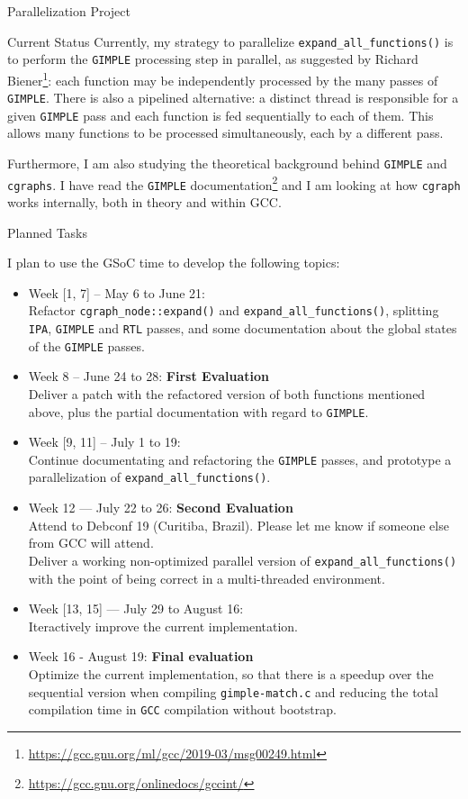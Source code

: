 \documentclass[12pt]{article}
\begin{document}
\begin{section}{Parallelization Project}
\begin{subsection}{Current Status}
Currently, my strategy to parallelize \texttt{expand\_all\_functions()} is to
perform the \texttt{GIMPLE} processing step in parallel, as suggested
by Richard Biener\footnote{\url{https://gcc.gnu.org/ml/gcc/2019-03/msg00249.html}}: each
function may be independently processed by the many passes of
\texttt{GIMPLE}.  There is also a pipelined alternative: a distinct
thread is responsible for a given \texttt{GIMPLE} pass and each
function is fed sequentially to each of them. This allows many
functions to be processed simultaneously, each by a different pass.

Furthermore, I am also studying the theoretical background behind \texttt{GIMPLE}
and \texttt{cgraphs}. I have read the \texttt{GIMPLE}
documentation\footnote{\url{https://gcc.gnu.org/onlinedocs/gccint/}} and
I am looking at how \texttt{cgraph} works internally, both in theory and within
GCC.

\end{subsection}

\begin{subsection}{Planned Tasks}

I plan to use the GSoC time to develop the following topics:

\begin{itemize}
 \item{Week [1, 7] -- May 6 to June 21:} \\
Refactor \texttt{cgraph\_node::expand()} and
\texttt{expand\_all\_functions()}, splitting \texttt{IPA},
\texttt{GIMPLE} and \texttt{RTL} passes, and some documentation about
the global states of the \texttt{GIMPLE} passes.
 \item{Week 8 -- June 24 to 28:} \textbf{First Evaluation} \\
Deliver a patch with the refactored version of both functions mentioned above,
plus the partial documentation with regard to \texttt{GIMPLE}.
 \item{Week [9, 11] -- July 1 to 19:} \\
Continue documentating and refactoring the \texttt{GIMPLE} passes, and
prototype a parallelization of \texttt{expand\_all\_functions()}.
 \item{Week 12 --- July 22 to 26:} \textbf{Second Evaluation} \\
Attend to Debconf 19 (Curitiba, Brazil). Please let me know
if someone else from GCC will attend. \\
Deliver a
working non-optimized parallel version of \texttt{expand\_all\_functions()}
with the point of being correct in a multi-threaded environment.
\item{Week [13, 15] --- July 29 to August 16:} \\
Iteractively improve the current implementation.
\item{Week 16 - August 19:} \textbf{Final evaluation}\\
Optimize the current implementation, so that there is a speedup over
the sequential version when compiling \texttt{gimple-match.c} and reducing the
total compilation time in \texttt{GCC} compilation without bootstrap.
\end{itemize}


\end{subsection}
\end{section}
\end{document}
